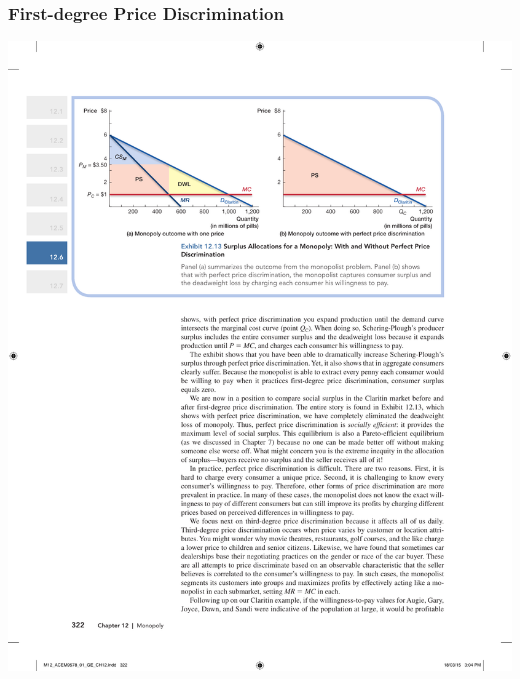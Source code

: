 \documentclass[12pt, xcolor=dvipsnames]{beamer}
\begin{document}
\begin{frame}
\frametitle{\bf First-degree Price Discrimination}
\begin{center}
\includegraphics[width=\linewidth]{figures/13.pdf}
\end{center}
\end{frame}
\end{document}
